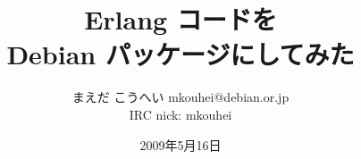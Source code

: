 




\documentclass[cjk,dvipdfmx,12pt]{beamer}
\usepackage{monthlypresentation}



\title{Erlang コードを \\ Debian パッケージにしてみた}
\author{まえだ こうへい mkouhei@debian.or.jp\\IRC nick: mkouhei}
\date{2009年5月16日}




